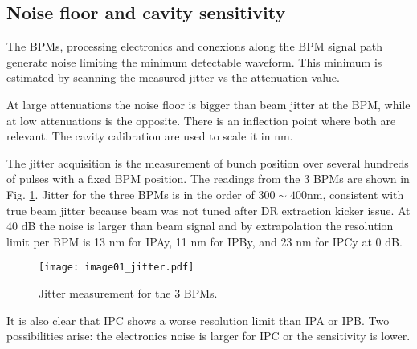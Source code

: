 \subsection{Noise floor and cavity sensitivity}
The BPMs, processing electronics and conexions along the BPM signal path generate noise limiting the minimum detectable waveform. This minimum is estimated by scanning the measured jitter vs the attenuation value.\par
At large attenuations the noise floor is bigger than beam jitter at the BPM, while at low attenuations is the opposite. There is an inflection point where both are relevant. The cavity calibration are used to scale it in nm.\par
The jitter acquisition is the measurement of bunch position over several hundreds of pulses with a fixed BPM position. 
The readings from the 3 BPMs are shown in Fig. \ref{f:resojitter}. Jitter for the three BPMs is in the order of $300\sim400$nm, consistent with true beam jitter because beam was not tuned after DR extraction kicker issue. At 40 dB the noise is larger than beam signal and by extrapolation the resolution limit per BPM is 13 nm for IPAy, 11 nm for IPBy, and 23 nm for IPCy at 0 dB.\par
\begin{figure}[!htb]
\centering%
 \texttt{[image: image01\_jitter.pdf]}\caption{Jitter measurement for the 3 BPMs.}\label{f:resojitter}
\end{figure}
It is also clear that IPC shows a worse resolution limit than IPA or IPB. Two possibilities arise: the electronics noise is larger for IPC or the sensitivity is lower.\par 
